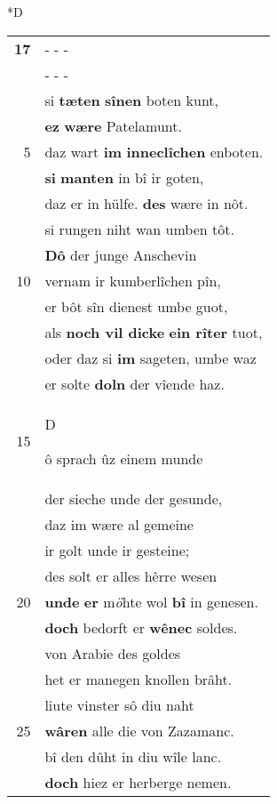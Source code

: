 \documentclass[8pt,a4paper,notitlepage]{article}
\begin{document}
\begin{table}[ht]
\begin{minipage}[t]{0.5\linewidth}
\small
\begin{center}*D
\end{center}
\begin{tabular}{rl}
\textbf{17} & \multicolumn{1}{l}{ - - - }\\ 
 & \multicolumn{1}{l}{ - - - }\\ 
 & si \textbf{tæten} \textbf{sînen} boten kunt,\\ 
 & \textbf{ez} \textbf{wære} Patelamunt.\\ 
5 & daz wart \textbf{im} \textbf{inneclîchen} enboten.\\ 
 & \textbf{si} \textbf{manten} in bî ir goten,\\ 
 & daz er in hülfe. \textbf{des} wære in nôt.\\ 
 & si rungen niht wan umben tôt.\\ 
 & \textbf{Dô} der junge Anschevin\\ 
10 & vernam ir kumberlîchen pîn,\\ 
 & er bôt sîn dienest umbe guot,\\ 
 & als \textbf{noch vil dicke} \textbf{ein rîter} tuot,\\ 
 & oder daz si \textbf{im} sageten, umbe waz\\ 
 & er solte \textbf{doln} der vîende haz.\\ 
15 & \begin{large}D\end{large}ô sprach ûz einem munde\\ 
 & der sieche unde der gesunde,\\ 
 & daz im wære al gemeine\\ 
 & ir golt unde ir gesteine;\\ 
 & des solt er alles hêrre wesen\\ 
20 & \textbf{unde} \textbf{er} m\textit{ö}hte wol \textbf{bî} in genesen.\\ 
 & \textbf{doch} bedorft er \textbf{wênec} soldes.\\ 
 & von Arabie des goldes\\ 
 & het er manegen knollen brâht.\\ 
 & liute vinster sô diu naht\\ 
25 & \textbf{wâren} alle die von Zazamanc.\\ 
 & bî den dûht in diu wîle lanc.\\ 
 & \textbf{doch} hiez er herberge nemen.\\ 

\end{tabular}
\end{minipage}
\end{table}
\end{document}
